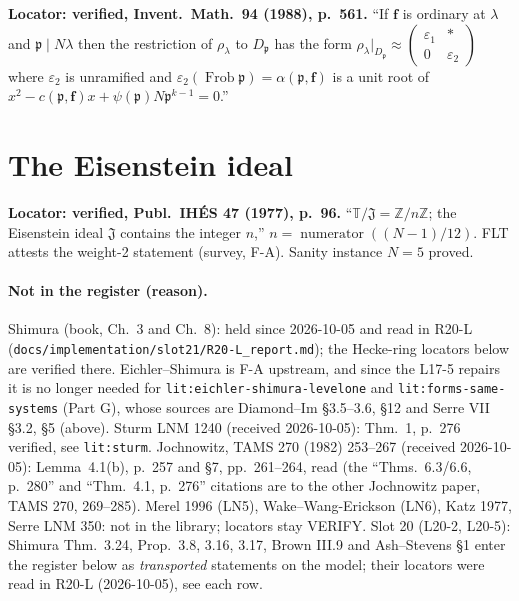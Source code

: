 \begin{hypothesis}\label{lit:wiles-2.1.4}
   \leanok
  \textbf{Locator: verified, Invent.\ Math.\ 94 (1988), p.~561.} ``If $\mathbf f$ is ordinary at $\lambda$ and
  $\mathfrak p\mid N\lambda$ then the restriction of $\rho_\lambda$ to $D_{\mathfrak p}$ has the form
  $\rho_\lambda|_{D_{\mathfrak p}}\approx\left(\begin{smallmatrix}\varepsilon_1&*\\0&\varepsilon_2\end{smallmatrix}\right)$
  where $\varepsilon_2$ is unramified and $\varepsilon_2(\operatorname{Frob}\mathfrak p)=\alpha(\mathfrak p,\mathbf f)$ is a unit
  root of $x^2-c(\mathfrak p,\mathbf f)x+\psi(\mathfrak p)N\mathfrak p^{k-1}=0$.''
\end{hypothesis}

\section{The Eisenstein ideal}

\begin{hypothesis}[Mazur, II (9.7)]\label{lit:mazur-9.7}
   \leanok
  \textbf{Locator: verified, Publ.\ IH\'ES 47 (1977), p.~96.} ``$\mathbb T/\mathfrak J=\mathbb Z/n\mathbb Z$; the Eisenstein
  ideal $\mathfrak J$ contains the integer $n$,'' $n=\operatorname{numerator}((N-1)/12)$. FLT attests the weight-2
  statement (survey, F-A). Sanity instance $N=5$ proved.
\end{hypothesis}

\paragraph{Not in the register (reason).} Shimura (book, Ch.~3 and Ch.~8): held since 2026-10-05 and read in R20-L
(\texttt{docs/implementation/slot21/R20-L\_report.md}); the Hecke-ring locators below are verified there. Eichler--Shimura is F-A
upstream, and since the L17-5 repairs it is no longer needed for \texttt{lit:eichler-shimura-levelone}
and \texttt{lit:forms-same-systems} (Part G), whose sources are Diamond--Im \S3.5--3.6, \S12 and Serre VII \S3.2, \S5 (above).
Sturm LNM 1240 (received 2026-10-05): Thm.~1, p.~276 verified, see \texttt{lit:sturm}. Jochnowitz, TAMS 270 (1982) 253--267
(received 2026-10-05): Lemma~4.1(b), p.~257 and \S7, pp.~261--264, read (the ``Thms.~6.3/6.6, p.~280'' and ``Thm.~4.1, p.~276''
citations are to the other Jochnowitz paper, TAMS 270, 269--285). Merel 1996 (LN5), Wake--Wang-Erickson (LN6), Katz 1977,
Serre LNM 350: not in the library; locators stay VERIFY.
Slot 20 (L20-2, L20-5): Shimura Thm.~3.24, Prop.~3.8, 3.16, 3.17, Brown III.9 and Ash--Stevens \S1 enter the register below as
\emph{transported} statements on the model; their locators were read in R20-L (2026-10-05), see each row.

